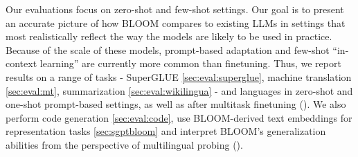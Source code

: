 \documentclass[twoside,11pt]{article}
\begin{document}
Our evaluations focus on zero-shot and few-shot settings. Our goal is to present an accurate picture of how BLOOM compares to existing LLMs in settings that most realistically reflect the way the models are likely to be used in practice. Because of the scale of these models, prompt-based adaptation and few-shot ``in-context learning'' are currently more common than finetuning. Thus, we report results on a range of tasks - SuperGLUE \ref{sec:eval:superglue}, machine translation \ref{sec:eval:mt}, summarization \ref{sec:eval:wikilingua} - and languages in zero-shot and one-shot prompt-based settings, as well as after multitask finetuning (). We also perform code generation \ref{sec:eval:code}, use BLOOM-derived text embeddings for representation tasks \ref{sec:sgptbloom} and interpret BLOOM's generalization abilities from the perspective of multilingual probing ().


\end{document}
